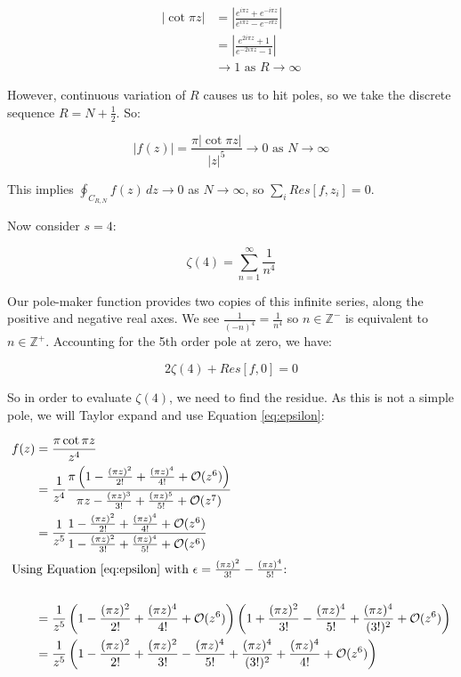 \documentclass{physics_notes}
\begin{document}
\begin{align*}
|\cot{\pi z}| &= \left|\frac{e^{i\pi z} + e^{-i\pi z}}{e^{i\pi z} - e^{-i\pi z}}\right| \\
&= \left|\frac{e^{2i\pi z} + 1}{e^{-2i\pi z} - 1}\right| \\
&\to 1 \text{ as } R \to\infty
\end{align*}

However, continuous variation of $R$ causes us to hit poles, so we take the discrete sequence $R=N+\frac{1}{2}$. So:

\[ \left|f(z)\right| = \frac{\pi | \cot{\pi z} |}{|z|^5} \to 0 \text{ as } N \to \infty \]

This implies $\oint_{C_{R,N}} f(z)\, dz \to 0$ as $N\to\infty$, so $\sum_i Res[f,z_i] = 0$.

Now consider $s=4$:

\[ \zeta(4) = \sum_{n=1}^\infty \frac{1}{n^4} \]

Our pole-maker function provides two copies of this infinite series, along the positive and negative real axes. We see $\frac{1}{(-n)^4} = \frac{1}{n^4}$ so $n\in \mathbb{Z}^-$ is equivalent to $n\in \mathbb{Z}^+$. Accounting for the 5th order pole at zero, we have:

\[ 2\zeta(4) + Res[f,0] = 0 \]

So in order to evaluate $\zeta(4)$, we need to find the residue. As this is not a simple pole, we will Taylor expand and use Equation \ref{eq:epsilon}:

\begin{align*}
	f(z) &= \frac{\pi \cot{\pi z}}{z^4} \\
	&= \frac{1}{z^4} \frac{\pi \left(1 - \frac{(\pi z)^2}{2!} + \frac{(\pi z)^4}{4!} + \mathcal{O}(z^6)\right)}{\pi z - \frac{(\pi z)^3}{3!} + \frac{(\pi z)^5}{5!} + \mathcal{O}(z^7)} \\
	&= \frac{1}{z^5} \frac{1 - \frac{(\pi z)^2}{2!} + \frac{(\pi z)^4}{4!} + \mathcal{O}(z^6)}{1 - \frac{(\pi z)^2}{3!} + \frac{(\pi z)^4}{5!} + \mathcal{O}(z^6)} \\
	\intertext{Using Equation \ref{eq:epsilon} with $\epsilon = \frac{(\pi z)^2}{3!} - \frac{(\pi z)^4}{5!}$:} \\
	&= \frac{1}{z^5}\left(1 - \frac{(\pi z)^2}{2!} + \frac{(\pi z)^4}{4!} + \mathcal{O}(z^6)\right)\left(1 + \frac{(\pi z)^2}{3!} - \frac{(\pi z)^4}{5!} + \frac{(\pi z)^4}{(3!)^2} + \mathcal{O}(z^6)\right) \\
	&= \frac{1}{z^5}\left(1 - \frac{(\pi z)^2}{2!} + \frac{(\pi z)^2}{3!} - \frac{(\pi z)^4}{5!} + \frac{(\pi z)^4}{(3!)^2} + \frac{(\pi z)^4}{4!} + \mathcal{O}(z^6)\right)
\end{align*}
\end{document}
